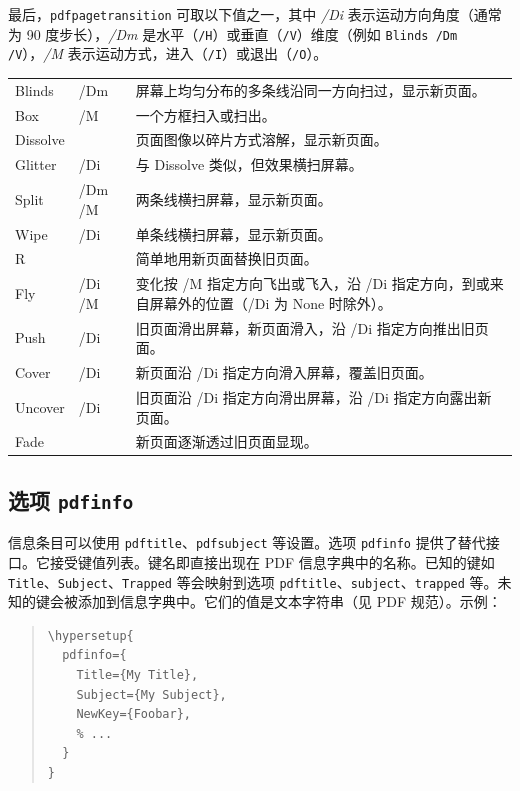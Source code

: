 \documentclass{article}
\begin{document}
最后，\texttt{pdfpagetransition} 可取以下值之一，其中 \textit{/Di} 表示运动方向角度（通常为 90 度步长），\textit{/Dm} 是水平（\texttt{/H}）或垂直（\texttt{/V}）维度（例如 \texttt{Blinds /Dm /V}），\textit{/M} 表示运动方式，进入（\texttt{/I}）或退出（\texttt{/O}）。

\begin{longtable}{@{}>{\ttfamily}llp{8.5cm}@{}}
Blinds   & /Dm    & 屏幕上均匀分布的多条线沿同一方向扫过，显示新页面。\\
Box      & /M     & 一个方框扫入或扫出。\\
Dissolve &        & 页面图像以碎片方式溶解，显示新页面。\\
Glitter  & /Di    & 与 Dissolve 类似，但效果横扫屏幕。\\
Split    & /Dm /M & 两条线横扫屏幕，显示新页面。\\
Wipe     & /Di    & 单条线横扫屏幕，显示新页面。\\
R        &        & 简单地用新页面替换旧页面。\\
Fly      & /Di /M & 变化按 /M 指定方向飞出或飞入，沿 /Di 指定方向，到或来自屏幕外的位置（/Di 为 None 时除外）。\\
Push     & /Di    & 旧页面滑出屏幕，新页面滑入，沿 /Di 指定方向推出旧页面。\\
Cover    & /Di    & 新页面沿 /Di 指定方向滑入屏幕，覆盖旧页面。\\
Uncover  & /Di    & 旧页面沿 /Di 指定方向滑出屏幕，沿 /Di 指定方向露出新页面。\\
Fade     &        & 新页面逐渐透过旧页面显现。

\end{longtable}

\subsection{选项 \texttt{pdfinfo}}

信息条目可以使用 \texttt{pdftitle}、\texttt{pdfsubject} 等设置。选项 \texttt{pdfinfo} 提供了替代接口。它接受键值列表。键名即直接出现在 PDF 信息字典中的名称。已知的键如 \texttt{Title}、\texttt{Subject}、\texttt{Trapped} 等会映射到选项 \texttt{pdftitle}、\texttt{subject}、\texttt{trapped} 等。未知的键会被添加到信息字典中。它们的值是文本字符串（见 PDF 规范）。示例：
\begin{quote}
\begin{verbatim}
\hypersetup{
  pdfinfo={
    Title={My Title},
    Subject={My Subject},
    NewKey={Foobar},
    % ...
  }
}
\end{verbatim}
\end{quote}
\end{document}
